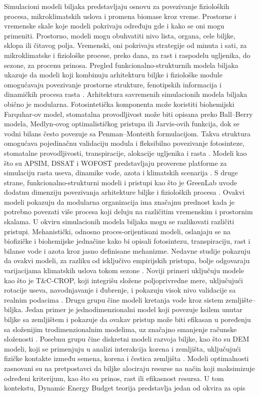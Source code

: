 \documentclass[a4paper,fleqn]{cas-dc}
\begin{document}
Simulacioni modeli biljaka predstavljaju osnovu za povezivanje fizioloških procesa, mikroklimatskih uslova i promena biomase kroz vreme. Prostorne i vremenske skale koje modeli pokrivaju određuju gde i kako se oni mogu primeniti. Prostorno, modeli mogu obuhvatiti nivo lista, organa, cele biljke, sklopa ili čitavog polja. Vremenski, oni pokrivaju strategije od minuta i sati, za mikroklimatske i fiziološke procese, preko dana, za rast i raspodelu ugljenika, do sezone, za procenu prinosa. Pregled funkcionalno-strukturnih modela biljaka ukazuje da modeli koji kombinuju arhitekturu biljke i fiziološke module omogućavaju povezivanje prostorne strukture, fenotipskih informacija i dinamičkih procesa rasta \cite{Louarn2020,Sievnen2014}. Arhitektura savremenih simulacionih modela biljaka obično je modularna. Fotosintetička komponenta može koristiti biohemijski Farquhar-ov model, stomatalna provodljivost može biti opisana preko Ball--Berry modela, Medlyn-ovog optimalističkog pristupa ili Jarvis-ovih funkcija, dok se vodni bilans često povezuje sa Penman--Monteith formulacijom. Takva struktura omogućava pojedinačnu validaciju modula i fleksibilno povezivanje fotosinteze, stomatalne provodljivosti, transpiracije, alokacije ugljenika i rasta \cite{Farquhar1980,Ball1987,Medlyn2011,Jarvis1976,Allen1998,Kim2003}. Modeli kao što su APSIM, DSSAT i WOFOST predstavljaju proverene platforme za simulaciju rasta useva, dinamike vode, azota i klimatskih scenarija \cite{Holzworth2014,Jones2003,deWit2019}. S druge strane, funkcionalno-strukturni modeli i pristupi kao što je GreenLab uvode dodatnu dimenziju povezivanja arhitekture biljke i fizioloških procesa \cite{DeReffye2020}. Ovakvi modeli pokazuju da modularna organizacija ima značajnu prednost kada je potrebno povezati više procesa koji deluju na različitim vremenskim i prostornim skalama. U okviru simulacionih modela biljaka mogu se razlikovati različiti pristupi. Mehanistički, odnosno proces-orijentisani modeli, oslanjaju se na biofizičke i biohemijske jednačine kako bi opisali fotosintezu, transpiraciju, rast i bilanse vode i azota kroz jasno definisane mehanizme. Nedavne studije pokazuju da ovakvi modeli, za razliku od isključivo empirijskih pristupa, bolje odgovaraju varijacijama klimatskih uslova tokom sezone \cite{Mamassi2024}. Noviji primeri uključuju modele kao što je T\&C-CROP, koji integrišu složene poljoprivredne mere, uključujući rotacije useva, navodnjavanje i đubrenje, i pokazuju visok nivo validacije sa realnim podacima \cite{BuckleyPaules2025}. Drugu grupu čine modeli kretanja vode kroz sistem zemljište--biljka. Jedan primer je jednodimenzionalni model koji povezuje ksilem unutar biljke sa zemljištem i pokazuje da ovakav pristup može biti efikasan u poređenju sa složenijim trodimenzionalnim modelima, uz značajno smanjenje računske složenosti \cite{Janott2011}. Posebnu grupu čine diskretni modeli razvoja biljke, kao što su DEM modeli, koji se primenjuju u analizi interakcija korena i zemljišta, uključujući fizičke kontakte između semena, korena i čestica zemljišta \cite{Tian2024}. Modeli optimalnosti zasnovani su na pretpostavci da biljke alociraju resurse na način koji maksimizuje određeni kriterijum, kao što su prinos, rast ili efikasnost resursa. U tom kontekstu, Dynamic Energy Budget teorija predstavlja jedan od okvira za opis 
\end{document}
